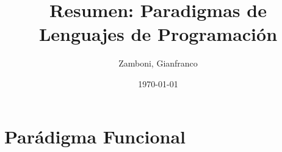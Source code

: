 \documentclass[10pt,a4paper]{book}
\begin{document}
\title{Resumen: Paradigmas de Lenguajes de Programación}

\date{\today}

\author{Zamboni, Gianfranco}
\begin{titlepage}
    \maketitle
    \thispagestyle{empty}
    \tableofcontents
\end{titlepage}

\newpage
\setcounter{page}{1}


\newpage

\chapter{Parádigma Funcional}





\appendix


\newpage

\end{document}
